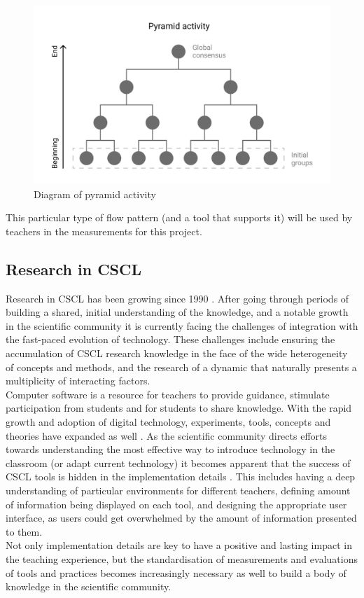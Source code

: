 \begin{figure}[!h]
    \includegraphics[clip,width=\columnwidth]{Figures/pyramid-activity.png}%
\caption{Diagram of pyramid activity}
\label{fig:pyramid}
\end{figure}
This particular type of flow pattern (and a tool that supports it) will be used by teachers in the measurements for this project.
\subsection{Research in CSCL}
Research in CSCL has been growing since 1990 \cite{Dillenbourg2009-jl}. After going through periods of building a shared, initial understanding of the knowledge, and a notable growth in the scientific community \cite{Dillenbourg2009-jl} it is currently facing the challenges of integration with the fast-paced evolution of technology. These challenges include ensuring the accumulation of CSCL research knowledge in the face of the wide heterogeneity of concepts and methods, and the research of a dynamic that naturally presents a multiplicity of interacting factors.\\
Computer software is a resource for teachers to provide guidance, stimulate participation from students and for students to share knowledge. With the rapid growth and adoption of digital technology, experiments, tools, concepts and theories have expanded as well \cite{Dillenbourg2009-jl}. As the scientific community directs efforts towards understanding the most effective way to introduce technology in the classroom (or adapt current technology) it becomes apparent that the success of CSCL tools is hidden in the implementation details \cite{Dillenbourg2011-zr}. This includes having a deep understanding of particular environments for different teachers, defining amount of information being displayed on  each tool, and designing the appropriate user interface, as users could get overwhelmed by the amount of information presented to them. \cite{Schwendimann2017-ci}\\
Not only implementation details are key to have a positive and lasting impact in the teaching experience, but the standardisation of measurements and evaluations of tools and practices becomes increasingly necessary as well to build a body of knowledge in the scientific community.
